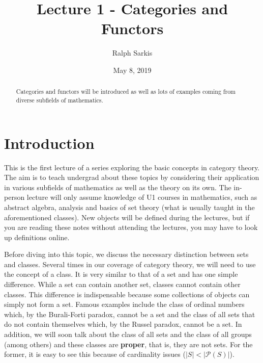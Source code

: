 \documentclass{article}
\title{Lecture 1 - Categories and Functors\vspace{-10pt}}
\author{Ralph Sarkis}
\date{\vspace{-10pt}May 8, 2019\vspace{-20pt}}  %
\theoremstyle{definition}
\theoremstyle{remark}
\newcommand{\mP}{\mathcal{P}}
\begin{document}
\maketitle
\begin{abstract} Categories and functors will be introduced as well as lots of examples coming from diverse subfields of mathematics.
\end{abstract}
\setcounter{section}{-1}
\section{Introduction}
This is the first lecture of a series exploring the basic concepts in category theory. The aim is to teach undergrad about these topics by considering their application in various subfields of mathematics as well as the theory on its own. The in-person lecture will only assume knowledge of U1 courses in mathematics, such as abstract algebra, analysis and basics of set theory (what is usually taught in the aforementioned classes). New objects will be defined during the lectures, but if you are reading these notes without attending the lectures, you may have to look up definitions online.

Before diving into this topic, we discuss the necessary distinction between sets and classes. Several times in our coverage of category theory, we will need to use the concept of a class. It is very similar to that of a set and has one simple difference. While a set can contain another set, classes cannot contain other classes. This difference is indispensable because some collections of objects can simply not form a set. Famous examples include the class of ordinal numbers which, by the Burali-Forti paradox, cannot be a set and the class of all sets that do not contain themselves which, by the Russel paradox, cannot be a set. In addition, we will soon talk about the class of all sets and the class of all groups (among others) and these classes are \textbf{proper}, that is, they are not sets. For the former, it is easy to see this because of cardinality issues ($|S| < |\mP(S)|$). 
\end{document}
